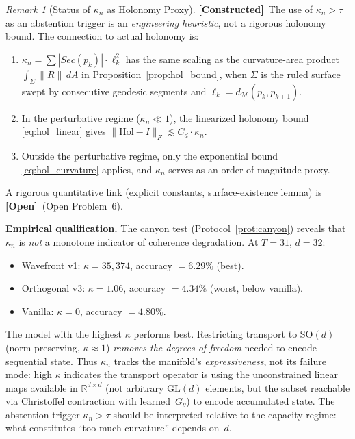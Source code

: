 \documentclass[11pt,a4paper]{article}
\theoremstyle{definition}
\theoremstyle{remark}
\newtheorem{remark}[theorem]{Remark}
\newcommand{\R}{\mathbb{R}}
\newcommand{\SO}{\mathrm{SO}}
\newcommand{\Hol}{\mathrm{Hol}}
\newcommand{\statusconstructed}{\textcolor{blue!70!black}{\textbf{[Constructed]}}}
\newcommand{\statusopen}{\textcolor{red!70!black}{\textbf{[Open]}}}
\begin{document}
\begin{remark}[Status of $\kappa_n$ as Holonomy Proxy]%
\label{rem:kappa_status}
\statusconstructed\ The use of $\kappa_n > \tau$ as an 
abstention trigger is an \emph{engineering heuristic}, not a 
rigorous holonomy bound. The connection to actual holonomy is:
\begin{enumerate}[nosep]
    \item $\kappa_n = \sum |Sec(p_k)| \cdot \ell_k^2$ has 
    the same scaling as the curvature-area product 
    $\int_\Sigma \|R\|\,dA$ in 
    Proposition~\ref{prop:hol_bound}, when $\Sigma$ is the 
    ruled surface swept by consecutive geodesic segments and 
    $\ell_k = d_{\mathcal{M}}(p_k, p_{k+1})$.
    \item In the perturbative regime 
    ($\kappa_n \ll 1$), the linearized holonomy bound 
    \eqref{eq:hol_linear} gives 
    $\|\Hol - I\|_F \lesssim C_d \cdot \kappa_n$.
    \item Outside the perturbative regime, only the 
    exponential bound \eqref{eq:hol_curvature} applies, and 
    $\kappa_n$ serves as an order-of-magnitude proxy.
\end{enumerate}
A rigorous quantitative link (explicit constants, 
surface-existence lemma) is \statusopen\ 
(Open Problem~6).

\medskip
\noindent\textbf{Empirical qualification.} The canyon test 
(Protocol~\ref{prot:canyon}) reveals that $\kappa_n$ is 
\emph{not} a monotone indicator of coherence degradation. 
At $T = 31$, $d = 32$:
\begin{itemize}[nosep]
  \item Wavefront v1: $\kappa = 35{,}374$, accuracy $= 6.29\%$ 
  (best).
  \item Orthogonal v3: $\kappa = 1.06$, accuracy $= 4.34\%$ 
  (worst, below vanilla).
  \item Vanilla: $\kappa = 0$, accuracy $= 4.80\%$.
\end{itemize}
The model with the highest $\kappa$ performs best. Restricting 
transport to $\SO(d)$ (norm-preserving, $\kappa \approx 1$) 
\emph{removes the degrees of freedom} needed to encode 
sequential state. Thus $\kappa_n$ tracks the manifold's 
\emph{expressiveness}, not its failure mode: high $\kappa$ 
indicates the transport operator is using the unconstrained 
linear maps available in $\R^{d \times d}$ (not arbitrary 
$\mathrm{GL}(d)$ elements, but the subset reachable via 
Christoffel contraction with learned~$G_\theta$) to encode 
accumulated state. The 
abstention trigger $\kappa_n > \tau$ should be interpreted 
relative to the capacity regime: what constitutes ``too much 
curvature'' depends on~$d$.
\end{remark}
\end{document}
